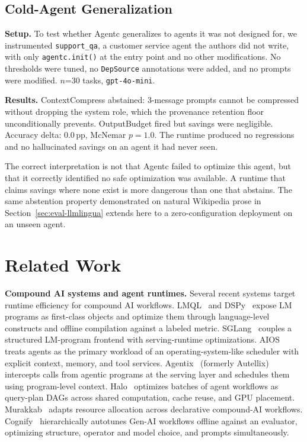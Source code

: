 \subsection{Cold-Agent Generalization}
\label{sec:eval-coldagent}

\textbf{Setup.} To test whether Agentc generalizes to agents it was not designed for,
we instrumented \texttt{support\_qa}, a customer service agent the authors did not
write, with only \texttt{agentc.init()} at the entry point and no other modifications.
No thresholds were tuned, no \texttt{DepSource} annotations were added, and no prompts
were modified. $n$=30 tasks, \texttt{gpt-4o-mini}.

\textbf{Results.} ContextCompress abstained: 3-message prompts cannot be compressed
without dropping the system role, which the provenance retention floor unconditionally
prevents. OutputBudget fired but savings were negligible. Accuracy delta: 0.0\,pp,
McNemar $p=1.0$. The runtime produced no regressions and no hallucinated savings on
an agent it had never seen.

The correct interpretation is not that Agentc failed to optimize this agent, but that
it correctly identified no safe optimization was available. A runtime that claims
savings where none exist is more dangerous than one that abstains. The same abstention
property demonstrated on natural Wikipedia prose in
Section~\ref{sec:eval-llmlingua} extends here to a zero-configuration deployment on
an unseen agent.

\section{Related Work}
\label{sec:related}

\textbf{Compound AI systems and agent runtimes.} Several recent systems target runtime
efficiency for compound AI workflows. LMQL~\cite{beurer2023lmql} and
DSPy~\cite{khattab2024dspy} expose LM programs as first-class objects and optimize
them through language-level constructs and offline compilation against a labeled
metric. SGLang~\cite{zheng2024sglang} couples a structured LM-program frontend with
serving-runtime optimizations. AIOS~\cite{mei2025aios} treats agents as the primary
workload of an operating-system-like scheduler with explicit context, memory, and tool
services. Agentix~\cite{luo2026agentix} (formerly Autellix) intercepts calls from
agentic programs at the serving layer and schedules them using program-level context.
Halo~\cite{shen2026halo} optimizes batches of agent workflows as query-plan DAGs
across shared computation, cache reuse, and GPU placement.
Murakkab~\cite{chaudhry2025murakkab} adapts resource allocation across declarative
compound-AI workflows. Cognify~\cite{he2025cognify} hierarchically autotunes Gen-AI
workflows offline against an evaluator, optimizing structure, operator and model
choice, and prompts simultaneously.

